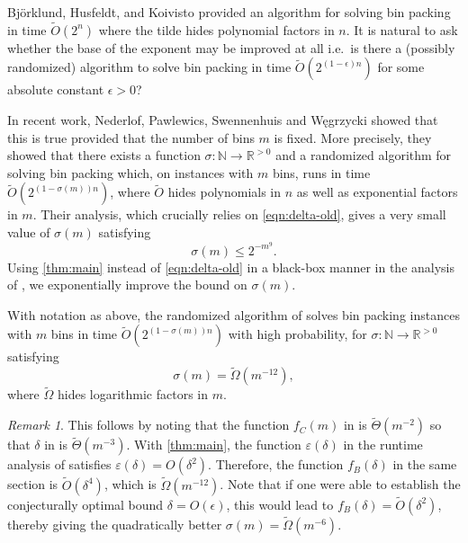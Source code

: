 \documentclass[11pt]{article}
\numberwithin{equation}{section}
\theoremstyle{definition}
\theoremstyle{remark}
\newtheorem*{remark}{Remark}
\newcommand{\mb}{\mathbb}
\begin{document}
Bj\"orklund, Husfeldt, and Koivisto \cite{BHK09} provided an algorithm for solving bin packing in time $\tilde{O}(2^{n})$ where the tilde hides polynomial factors in $n$. It is natural to ask whether the base of the exponent may be improved at all i.e.\ is there a (possibly randomized) algorithm to solve bin packing in time $\tilde{O}(2^{(1-\epsilon)n})$ for some absolute constant $\epsilon > 0$?

In recent work, Nederlof, Pawlewics, Swennenhuis and W{\k{e}}grzycki \cite{NPSW20} showed that this is true provided that the number of bins $m$ is fixed. More precisely, they showed that there exists a function $\sigma: \mb{N} \to \mb{R}^{>0}$ and a randomized algorithm for solving bin packing which, on instances with $m$ bins, runs in time $\tilde{O}(2^{(1-\sigma(m))n})$, where $\tilde{O}$ hides polynomials in $n$ as well as exponential factors in $m$. Their analysis, which crucially relies on \cref{eqn:delta-old}, gives a very small value of $\sigma(m)$ satisfying
\begin{equation}
    \label{eqn:sigma-old}
    \sigma(m) \le 2^{-m^9}. 
\end{equation}
Using \cref{thm:main} instead of \cref{eqn:delta-old} in a black-box manner in the analysis of \cite{NPSW20}, we exponentially improve the bound on $\sigma(m)$.
\begin{corollary}
\label{cor:bin-packing}
With notation as above, the randomized algorithm of \cite{NPSW20} solves bin packing instances with $m$ bins in time $\tilde{O}(2^{(1-\sigma(m))n})$ with high probability, for $\sigma \colon \mb{N} \to \mb{R}^{> 0}$ satisfying
\begin{equation}
    \label{eqn:sigma-new}
    \sigma(m) = \tilde{\Omega}(m^{-12}),
\end{equation}
where $\tilde{\Omega}$ hides logarithmic factors in $m$.
\end{corollary}

\begin{remark}
This follows by noting that the function $f_C(m)$ in \cite[Section~3.6]{NPSW20} is $\tilde{\Theta}(m^{-2})$ so that $\delta$ in \cite[Section~3.6]{NPSW20} is $\tilde{\Theta}(m^{-3})$. With \cref{thm:main}, the function $\varepsilon(\delta)$ in the runtime analysis of \cite[Section~3.4]{NPSW20} satisfies $\varepsilon(\delta) = O(\delta^2)$. Therefore, the function $f_B(\delta)$ in the same section is $\tilde{O}(\delta^{4})$, which is $\tilde{\Omega}(m^{-12})$. Note that if one were able to establish the conjecturally optimal bound $\delta = O(\epsilon)$, this would lead to $f_B(\delta) = \tilde{O}(\delta^{2})$, thereby giving the quadratically better $\sigma(m) = \tilde{\Omega}(m^{-6})$.
\end{remark}
\end{document}
